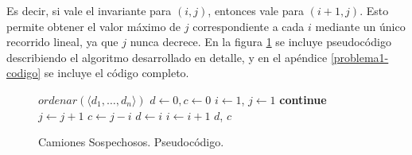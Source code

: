 Es decir, si vale el invariante para $(i,j)$, entonces vale para $(i+1,j)$. Esto permite obtener el valor máximo de $j$ correspondiente a cada $i$ mediante un único recorrido lineal, ya que $j$ nunca decrece. En la figura \ref{problema1-pseudo} se incluye pseudocódigo describiendo el algoritmo desarrollado en detalle, y en el apéndice \ref{problema1-codigo} se incluye el código completo.

\begin{center}
\begin{figure}
    \begin{pseudo}
            \State $ordenar(\langle d_1, \ldots, d_n \rangle)$ 
            \State $d \leftarrow 0, c \leftarrow 0$ 
            \State $i \leftarrow 1$, $j \leftarrow 1$ 
             
                    \textbf{continue} 
                \EndIf
                 
                    \State $j \leftarrow j + 1$ 
                \EndWhile
                 
                    \State $c \leftarrow j - i$ 
                    \State $d \leftarrow i$ 
                \EndIf
                \State $i \leftarrow i + 1$ 
            \EndWhile
            \Return $d$, $c$
        \EndProcedure
    \end{pseudo}
    \caption{Camiones Sospechosos. Pseudocódigo.}
    \label{problema1-pseudo}
\end{figure}
\end{center}
